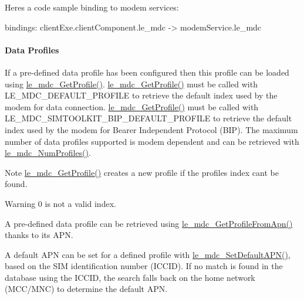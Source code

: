 Here\textquotesingle{}s a code sample binding to modem services\+: \begin{DoxyVerb}bindings:
{
   clientExe.clientComponent.le_mdc -> modemService.le_mdc
}
\end{DoxyVerb}
\hypertarget{c_mdc_le_mdc_profile}{}\paragraph{Data Profiles}\label{c_mdc_le_mdc_profile}
If a pre-\/defined data profile has been configured then this profile can be loaded using \hyperlink{le__mdc__interface_8h_a638b693cd5f644fa5c24f81e1e36483c}{le\+\_\+mdc\+\_\+\+Get\+Profile()}. \hyperlink{le__mdc__interface_8h_a638b693cd5f644fa5c24f81e1e36483c}{le\+\_\+mdc\+\_\+\+Get\+Profile()} must be called with {\ttfamily L\+E\+\_\+\+M\+D\+C\+\_\+\+D\+E\+F\+A\+U\+L\+T\+\_\+\+P\+R\+O\+F\+I\+LE} to retrieve the default index used by the modem for data connection. \hyperlink{le__mdc__interface_8h_a638b693cd5f644fa5c24f81e1e36483c}{le\+\_\+mdc\+\_\+\+Get\+Profile()} must be called with {\ttfamily L\+E\+\_\+\+M\+D\+C\+\_\+\+S\+I\+M\+T\+O\+O\+L\+K\+I\+T\+\_\+\+B\+I\+P\+\_\+\+D\+E\+F\+A\+U\+L\+T\+\_\+\+P\+R\+O\+F\+I\+LE} to retrieve the default index used by the modem for Bearer Independent Protocol (B\+IP). The maximum number of data profiles supported is modem dependent and can be retrieved with \hyperlink{le__mdc__interface_8h_a790602f1b17d7bf9626a51eac5599439}{le\+\_\+mdc\+\_\+\+Num\+Profiles()}.

\begin{DoxyNote}{Note}
\hyperlink{le__mdc__interface_8h_a638b693cd5f644fa5c24f81e1e36483c}{le\+\_\+mdc\+\_\+\+Get\+Profile()} creates a new profile if the profile\textquotesingle{}s index can\textquotesingle{}t be found.
\end{DoxyNote}
\begin{DoxyWarning}{Warning}
0 is not a valid index.
\end{DoxyWarning}
A pre-\/defined data profile can be retrieved using \hyperlink{le__mdc__interface_8h_a2ea0573e6e9cd16c04e95146f2b2e693}{le\+\_\+mdc\+\_\+\+Get\+Profile\+From\+Apn()} thanks to its A\+PN.

A default A\+PN can be set for a defined profile with \hyperlink{le__mdc__interface_8h_ad44bd756fd5cbfd43a5b348054786a4d}{le\+\_\+mdc\+\_\+\+Set\+Default\+A\+P\+N()}, based on the S\+IM identification number (I\+C\+C\+ID). If no match is found in the database using the I\+C\+C\+ID, the search falls back on the home network (M\+C\+C/\+M\+NC) to determine the default A\+PN.

